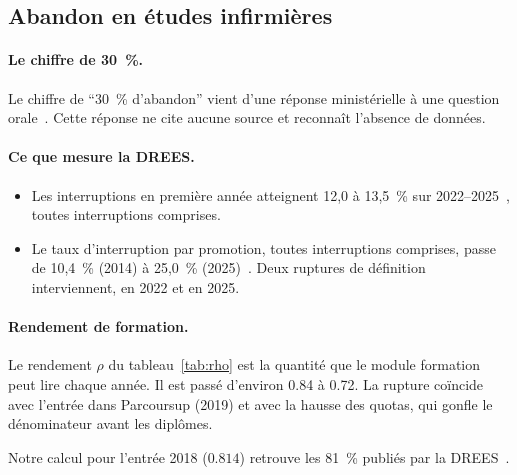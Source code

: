 \documentclass[11pt]{article}
\begin{document}
\subsection{Abandon en études infirmières}

\paragraph{Le chiffre de 30~\%.}
Le chiffre de \enquote{30~\% d'abandon} vient d'une réponse ministérielle à
une question orale~\cite{qo101}. Cette réponse ne cite aucune source et
reconnaît l'absence de données.

\paragraph{Ce que mesure la DREES.}
\begin{itemize}
\item Les interruptions en première année atteignent 12,0 à 13,5~\% sur
  2022--2025~\cite{drees491}, toutes interruptions comprises.
\item Le taux d'interruption par promotion, toutes interruptions comprises,
  passe de 10,4~\% (2014) à 25,0~\% (2025)~\cite{drees491}. Deux ruptures de
  définition interviennent, en 2022 et en 2025.
\end{itemize}

\paragraph{Rendement de formation.}
Le rendement $\rho$ du tableau~\ref{tab:rho} est la quantité que le module
formation peut lire chaque année. Il est passé d'environ \num{0.84} à
\num{0.72}. La rupture coïncide avec l'entrée dans Parcoursup (2019) et
avec la hausse des quotas, qui gonfle le dénominateur avant les diplômes.

Notre calcul pour l'entrée 2018 ($\num{0.814}$\mesure) retrouve les 81~\%
publiés par la DREES~\cite{er1266}.
\end{document}
